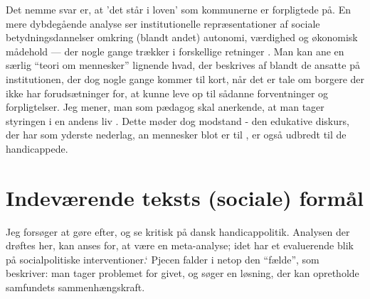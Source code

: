 Det nemme svar er, at 'det står i loven' som kommunerne er forpligtede på.
En mere dybdegående analyse ser institutionelle repræsentationer af sociale betydningsdannelser omkring (blandt andet) autonomi, værdighed og økonomisk mådehold --- der nogle gange trækker i forskellige retninger \autocite{moutsiosSocialeInstitutionerOg2016a}.
Man kan ane en særlig “teori om mennesker” lignende hvad, der beskrives af \citeauthor{goffmanAsylumsEssaysSocial1991} blandt de ansatte på institutionen, der dog nogle gange kommer til kort, når det er tale om borgere der ikke har forudsætninger for, at kunne leve op til sådanne forventninger og forpligtelser.
Jeg mener, man som pædagog skal anerkende, at man tager styringen i en andens liv \autocite{andersenSocialWorkPower2018}.
Dette møder dog modstand - den edukative diskurs, der har som yderste nederlag, an mennesker blot er til \autocite{lieberkindEdukativeDiskurs2016}, er også udbredt til de handicappede.

\section{Indeværende teksts (sociale) formål}
Jeg forsøger at gøre \citeauthor{scheurichPolicyArchaeologyNew1994} efter, og se kritisk på dansk handicappolitik.
Analysen der drøftes her, kan anses for, at være en meta-analyse; idet  har et evaluerende blik på socialpolitiske interventioner.`
Pjecen falder i netop den “fælde”, som \citeauthor{scheurichPolicyArchaeologyNew1994} beskriver: man tager problemet for givet, og søger en løsning, der kan opretholde samfundets sammenhængskraft.

